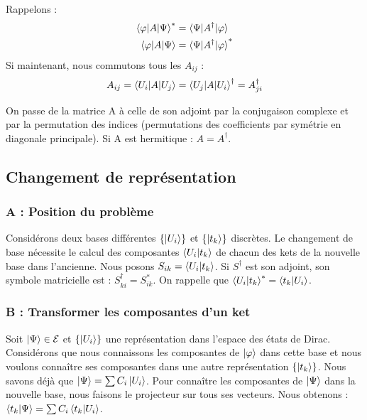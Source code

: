 \documentclass[12pt,a4paper,titlepage]{book}
\begin{document}
Rappelons :
\begin{align*}
\braket{\varphi | A | \Psi}^* &= \braket{\Psi | A^{\dagger} | \varphi}\\
\braket{\varphi | A | \Psi} &= \braket{\Psi | A^{\dagger} | \varphi}^*
\end{align*}
Si maintenant, nous commutons tous les $A_{ij}$ :
\begin{equation*}
A_{ij} = \braket{U_i | A | U_j} = \braket{U_j | A | U_i}^{\dagger} = A_{ji}^{\dagger}
\end{equation*}

On passe de la matrice A à celle de son adjoint par la conjugaison complexe et par la permutation des indices (permutations des coefficients par symétrie en diagonale principale). Si A est hermitique : $A = A^{\dagger}$.

\subsection{Changement de représentation}
\subsubsection{A : Position du problème}

Considérons deux bases différentes $\left\lbrace \ket{U_i} \right\rbrace$ et $\left\lbrace \ket{t_k} \right\rbrace$ discrètes. Le changement de base nécessite le calcul des composantes $\braket{U_i | t_k}$ de chacun des kets de la nouvelle base dans l'ancienne. Nous posons $S_{ik} = \braket{U_i | t_k}$. Si $S^{\dagger}$ est son adjoint, son symbole matricielle est : $S_{ki}^{\dagger} = S_{ik}^{*}$. On rappelle que $\braket{U_i | t_k}^{*} = \braket{t_k | U_i}$.

\subsubsection{B : Transformer les composantes d'un ket}

Soit $\ket{\Psi} \in \mathcal{E}$ et $\left\lbrace \ket{U_i} \right\rbrace$ une représentation dans l'espace des états de Dirac. Considérons que nous connaissons les composantes de $\ket{\varphi}$ dans cette base et nous voulons connaître ses composantes dans une autre représentation $\left\lbrace \ket{t_k} \right\rbrace$. Nous savons déjà que $\ket{\Psi} = \sum C_i \ket{U_i}$. Pour connaître les composantes de $\ket{\Psi}$ dans la nouvelle base, nous faisons le projecteur sur tous ses vecteurs. Nous obtenons : $\braket{t_k | \Psi} = \sum C_i \braket{t_k | U_i}$.
\end{document}
